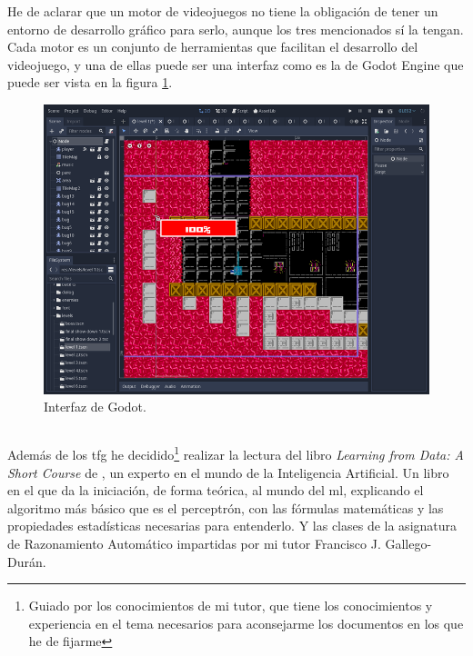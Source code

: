 He de aclarar que un motor de videojuegos no tiene la obligación de tener un entorno de desarrollo gráfico para serlo, aunque los tres mencionados sí la tengan. Cada motor es un conjunto de herramientas que facilitan el desarrollo del videojuego, y una de ellas puede ser una interfaz como es la de Godot Engine que puede ser vista en la figura \ref{Godot interfaz}. 
\begin{figure}[H]
	\centering
	\includegraphics[width=13cm]{archivos/imagenes/Godot-captura.png}
	\caption[Interfaz de Godot.]{Interfaz de Godot\footnotemark.}
	\label{Godot interfaz}
\end{figure}

\subsection{}
Además de los \gls{tfg} he decidido\footnote{Guiado por los conocimientos de mi tutor, que tiene los conocimientos y experiencia en el tema necesarios para aconsejarme los documentos en los que he de fijarme} realizar la lectura del libro \textit{Learning from Data: A Short Course} de , un experto en el mundo de la Inteligencia Artificial. Un libro en el que da la iniciación, de forma teórica, al mundo del \gls{ml}, explicando el algoritmo más básico que es el perceptrón, con las fórmulas matemáticas y las propiedades estadísticas necesarias para entenderlo. Y las clases de la asignatura de Razonamiento Automático impartidas por mi tutor Francisco J. Gallego-Durán.


